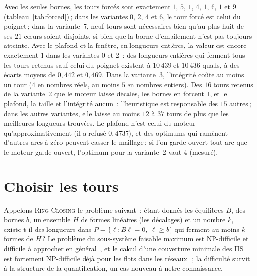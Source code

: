\documentclass[11pt,a4paper]{article}
\newcommand{\RC}{\textup{\textsc{Ring-Closing}}}
\begin{document}
Avec les seules bornes, les tours forcés sont exactement $1$, $5$, $1$, $4$,
$1$, $6$, $1$ et $9$ (tableau~\ref{tab:forced})\,; dans les variantes 0, 2,
4 et 6, le tour forcé est celui du poignet\,; dans la variante~7, neuf tours
sont nécessaires bien qu'au plus huit de ses $21$ cœurs soient disjoints, si
bien que la borne d'empilement n'est pas toujours atteinte. Avec le plafond
et la fenêtre, en longueurs entières, la valeur est encore exactement $1$ dans
les variantes 0 et 2~: des longueurs entières qui ferment tous les tours
retenus sauf celui du poignet existent à $10\,439$ et $10\,436$ quads, à des
écarts moyens de $0,442$ et $0,469$. Dans la variante~3, l'intégrité coûte au
moins un tour ($4$ en nombres réels, au moins $5$ en nombres entiers). Des
$16$ tours retenus de la variante~2 que le moteur laisse décalés, les bornes
en forcent $1$, et le plafond, la taille et l'intégrité aucun~: l'heuristique
est responsable des $15$ autres\,; dans les autres variantes, elle laisse au
moins $12$ à $37$ tours de plus que les meilleures longueurs trouvées. Le
plafond n'est celui du moteur qu'approximativement (il a refusé $0,4737$), et
des optimums qui ramènent d'autres arcs à zéro peuvent casser le maillage\,;
si l'on garde ouvert tout arc que le moteur garde ouvert, l'optimum pour la
variante~2 vaut $4$ (mesuré).

\section{Choisir les tours}\label{sec:choosing}

Appelons \RC{} le problème suivant~: étant donnés les équilibres $B$, des
bornes $b$, un ensemble $H$ de formes linéaires (les décalages) et un nombre
$k$, existe-t-il des longueurs dans $P = \{\ell : B\ell = 0,\ \ell \ge b\}$
qui ferment au moins $k$ formes de $H$\,? Le problème du sous-système
faisable maximum est NP-difficile et difficile à approcher en
général~\cite{amaldi1995complexity}, et le calcul d'une couverture minimale
des IIS est fortement NP-difficile déjà pour les flots dans les
réseaux~\cite{joormann2015flowiis}\,; la difficulté survit à la structure de
la quantification, un cas nouveau à notre connaissance.
\end{document}
